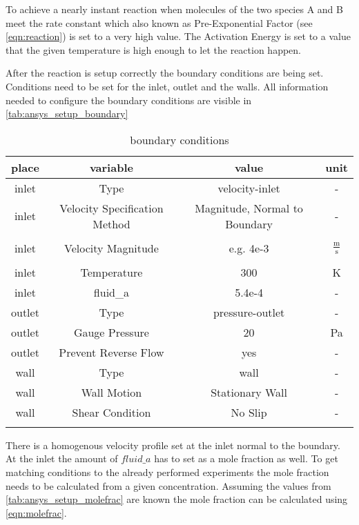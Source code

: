\documentclass[../thesis.tex]{subfiles}
\begin{document}
To achieve a nearly instant reaction when molecules of the two species A and B meet the rate constant which also known as Pre-Exponential Factor (see \autoref{eqn:reaction}) is set to a very high value. The Activation Energy is set to a value that the given temperature is high enough to let the reaction happen.

After the reaction is setup correctly the boundary conditions are being set. Conditions need to be set for the inlet, outlet and the walls. All information needed to configure the boundary conditions are visible in \autoref{tab:ansys_setup_boundary}

\begin{table} [htb]
	\centering
	\caption{boundary conditions}
	\begin{tabular}{ cccc }
		\hline
		place & variable & value & unit \\
		\hline
		inlet & Type & velocity-inlet & - \\
		inlet & Velocity Specification Method & Magnitude, Normal to Boundary & - \\
		\\[-1em]
		inlet & Velocity Magnitude & e.g. 4e-3 & $\frac{\text{m}}{\text{s}}$ \\
		\\[-1em]
		inlet & Temperature & 300 & K \\
		inlet & fluid\_a & 5.4e-4 & - \\
		outlet & Type & pressure-outlet & - \\
		outlet & Gauge Pressure & 20 & Pa \\
		outlet & Prevent Reverse Flow & yes & - \\
		wall & Type & wall & - \\
		wall & Wall Motion & Stationary Wall & - \\
		wall & Shear Condition & No Slip & - \\
		\hline
		\label{tab:ansys_setup_boundary}
	\end{tabular}
\end{table}
There is a homogenous velocity profile set at the inlet normal to the boundary. At the inlet the amount of $fluid\_a$ has to set as a mole fraction as well. To get matching conditions to the already performed experiments the mole fraction needs to be calculated from a given concentration. Assuming the values from \autoref{tab:ansys_setup_molefrac} are known the mole fraction can be calculated using \autoref{eqn:molefrac}.
\end{document}
